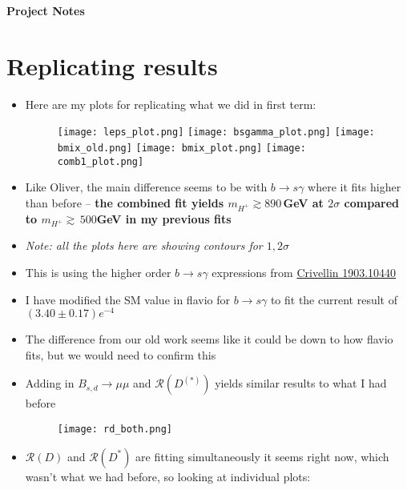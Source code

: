 \documentclass[11pt]{article}
\begin{document}
\thispagestyle{fancy}
{\Large\bfseries Project Notes}
\section{Replicating results}
\begin{itemize}
    \item Here are my plots for replicating what we did in first term:
        \begin{figure}[H]
            \centering
            \texttt{[image: leps\_plot.png]}
            \texttt{[image: bsgamma\_plot.png]}
            \texttt{[image: bmix\_old.png]}
            \texttt{[image: bmix\_plot.png]}
            \texttt{[image: comb1\_plot.png]}
        \end{figure}
    \item Like Oliver, the main difference seems to be with $b\to s\gamma$ where it fits higher than before -- \textbf{the combined fit yields $m_{H^+}\gtrsim890\,$GeV at $2\sigma$ compared to $m_{H^+}\gtrsim\,500$GeV in my previous fits}
    \item \textit{Note: all the plots here are showing contours for $1,2\sigma$}
    \item This is using the higher order $b\to s\gamma$ expressions from \href{https://arxiv.org/pdf/1903.10440}{Crivellin 1903.10440}
    \item I have modified the SM value in flavio for $b\to s\gamma$ to fit the current result of $(3.40\pm0.17)e^{-4}$ 
    \item The difference from our old work seems like it could be down to how flavio fits, but we would need to confirm this 
    \item Adding in $B_{s,d}\to\mu\mu$ and $\mathcal{R}(D^{(*)})$ yields similar results to what I had before
        \begin{figure}[H]
            \centering
            \texttt{[image: rd\_both.png]}
        \end{figure}
    \item $\mathcal{R}(D)$ and $\mathcal{R}(D^*)$ are fitting simultaneously it seems right now, which wasn't what we had before, so looking at individual plots:

\end{itemize}
\end{document}
